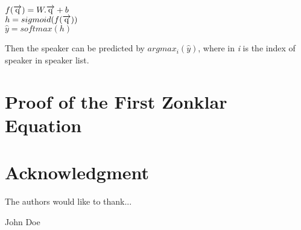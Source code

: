 \documentclass[conference]{IEEEtran}
\begin{document}
\begin{center}
	$f(\overrightarrow{\rm q}) = W.\overrightarrow{\rm q} + b$\\
	$h = sigmoid(f(\overrightarrow{\rm q}))$\\
	$\hat{y} = softmax(h)$
\end{center}

Then the speaker can be predicted by $argmax_i(\hat{y})$, where in \emph{i} is the index of speaker in speaker list.

\appendices
\section{Proof of the First Zonklar Equation}
\blindtext

\section*{Acknowledgment}


The authors would like to thank...


\ifCLASSOPTIONcaptionsoff
  \newpage
\fi



\begin{IEEEbiography}{John Doe}
\blindtext
\end{IEEEbiography}
\end{document}
